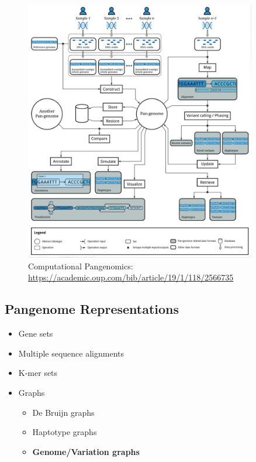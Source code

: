 \documentclass[
]{book}
\providecommand{\tightlist}{%
  \setlength{\itemsep}{0pt}\setlength{\parskip}{0pt}}
\begin{document}
\begin{figure}
\centering
\includegraphics[width=0.9\textwidth,height=\textheight]{./Figures/Computational.png}
\caption{Computational Pangenomics: \url{https://academic.oup.com/bib/article/19/1/118/2566735}}
\end{figure}

\hypertarget{pangenome-representations}{%
\subsection{Pangenome Representations}\label{pangenome-representations}}

\begin{itemize}
\tightlist
\item
  Gene sets
\item
  Multiple sequence alignments
\item
  K-mer sets
\item
  Graphs

  \begin{itemize}
  \tightlist
  \item
    De Bruijn graphs
  \item
    Haptotype graphs
  \item
    \textbf{Genome/Variation graphs}
  \end{itemize}
\end{itemize}
\end{document}
